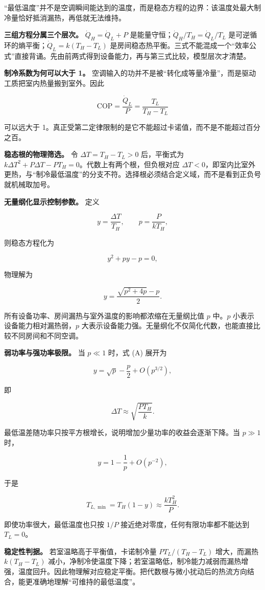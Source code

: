 \documentclass[12pt,a4paper,UTF8]{ctexart}
\begin{document}
``最低温度''并不是空调瞬间能达到的温度，而是稳态方程的边界：该温度处最大制冷量恰好抵消漏热，再低就无法维持。

\textbf{三组方程分属三个层次。} \(\dot Q_H=\dot Q_L+P\)
是能量守恒；\(\dot Q_H/T_H=\dot Q_L/T_L\)
是可逆循环的熵平衡；\(\dot Q_L=k(T_H-T_L)\)
是房间稳态热平衡。三式不能混成一个``效率公式''直接背诵。先由前两式得到设备能力，再与第三式比较，模型层次才清楚。

\textbf{制冷系数为何可以大于 1。}
空调输入的功并不是被``转化成等量冷量''，而是驱动工质把室内热量搬到室外。因此

\[
\mathrm{COP}=\frac{\dot Q_L}{P}
=\frac{T_L}{T_H-T_L}
\]

可以远大于
1。真正受第二定律限制的是它不能超过卡诺值，而不是不能超过百分之百。

\textbf{稳态根的物理筛选。} 令 \(\Delta T=T_H-T_L>0\) 后，平衡式为
\(k\Delta T^2+P\Delta T-PT_H=0\)。代数上有两个根，但负根对应
\(\Delta T<0\)，即室内比室外更热，与``制冷最低温度''的分支不符。选择根必须结合定义域，而不是看到正负号就机械取加号。

\textbf{无量纲化显示控制参数。} 定义

\[
y=\frac{\Delta T}{T_H},
\qquad
p=\frac{P}{kT_H},
\]

则稳态方程化为

\[
y^2+py-p=0,
\]

物理解为

\[
y=\frac{\sqrt{p^2+4p}-p}{2}. \tag{A}
\]

所有设备功率、房间漏热与室外温度的影响都浓缩在无量纲比值 \(p\) 中。\(p\)
小表示设备能力相对漏热弱，\(p\)
大表示设备能力强。无量纲化不仅简化代数，也能直接比较不同房间和不同空调。

\textbf{弱功率与强功率极限。} 当 \(p\ll1\) 时，式 (A) 展开为

\[
y=\sqrt p-\frac p2+O(p^{3/2}),
\]

即

\[
\Delta T\approx\sqrt{\frac{PT_H}{k}}.
\]

最低温差随功率只按平方根增长，说明增加少量功率的收益会逐渐下降。当
\(p\gg1\) 时，

\[
y=1-\frac1p+O(p^{-2}),
\]

于是

\[
T_{L,\min}=T_H(1-y)\approx\frac{kT_H^2}{P}.
\]

即使功率很大，最低温度也只按 \(1/P\)
接近绝对零度，任何有限功率都不能达到 \(T_L=0\)。

\textbf{稳定性判据。} 若室温略高于平衡值，卡诺制冷量 \(PT_L/(T_H-T_L)\)
增大，而漏热 \(k(T_H-T_L)\)
减小，净制冷使温度下降；若室温略低，制冷能力减弱而漏热增强，温度回升。因此物理解对应稳定平衡。把代数根与微小扰动后的热流方向结合，能更准确地理解``可维持的最低温度''。
\end{document}

